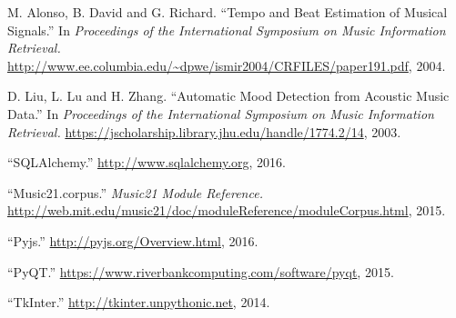 \documentclass{article}
\begin{document}
\begin{thebibliography}{cites}
M. Alonso, B. David and G. Richard. ``Tempo and Beat Estimation of Musical Signals.'' In {\it Proceedings of the International Symposium on Music Information Retrieval.} \url{http://www.ee.columbia.edu/~dpwe/ismir2004/CRFILES/paper191.pdf}, 2004.

D. Liu, L. Lu and H. Zhang. ``Automatic Mood Detection from Acoustic Music Data.'' In {\it Proceedings of the International Symposium on Music Information Retrieval.} \url{https://jscholarship.library.jhu.edu/handle/1774.2/14}, 2003.

``SQLAlchemy.'' \url{http://www.sqlalchemy.org}, 2016.

``Music21.corpus.'' {\it Music21 Module Reference.} \url{http://web.mit.edu/music21/doc/moduleReference/moduleCorpus.html}, 2015.

``Pyjs.'' \url{http://pyjs.org/Overview.html}, 2016.

``PyQT.'' \url{https://www.riverbankcomputing.com/software/pyqt}, 2015.

``TkInter.'' \url{http://tkinter.unpythonic.net}, 2014.

\end{thebibliography}
\end{document}
